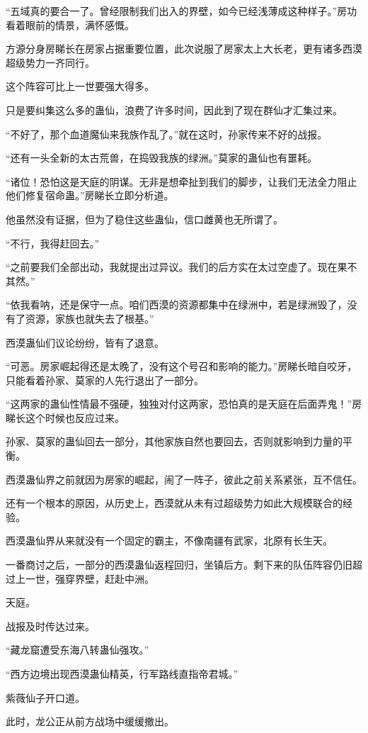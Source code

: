 \begin{this_body}
“五域真的要合一了。曾经限制我们出入的界壁，如今已经浅薄成这种样子。”房功看着眼前的情景，满怀感慨。

方源分身房睇长在房家占据重要位置，此次说服了房家太上大长老，更有诸多西漠超级势力一齐同行。

这个阵容可比上一世要强大得多。

只是要纠集这么多的蛊仙，浪费了许多时间，因此到了现在群仙才汇集过来。

“不好了，那个血道魔仙来我族作乱了。”就在这时，孙家传来不好的战报。

“还有一头全新的太古荒兽，在捣毁我族的绿洲。”莫家的蛊仙也有噩耗。

“诸位！恐怕这是天庭的阴谋。无非是想牵扯到我们的脚步，让我们无法全力阻止他们修复宿命蛊。”房睇长立即分析道。

他虽然没有证据，但为了稳住这些蛊仙，信口雌黄也无所谓了。

“不行，我得赶回去。”

“之前要我们全部出动，我就提出过异议。我们的后方实在太过空虚了。现在果不其然。”

“依我看呐，还是保守一点。咱们西漠的资源都集中在绿洲中，若是绿洲毁了，没有了资源，家族也就失去了根基。”

西漠蛊仙们议论纷纷，皆有了退意。

“可恶。房家崛起得还是太晚了，没有这个号召和影响的能力。”房睇长暗自咬牙，只能看着孙家、莫家的人先行退出了一部分。

“这两家的蛊仙性情最不强硬，独独对付这两家，恐怕真的是天庭在后面弄鬼！”房睇长这个时候也反应过来。

孙家、莫家的蛊仙回去一部分，其他家族自然也要回去，否则就影响到力量的平衡。

西漠蛊仙界之前就因为房家的崛起，闹了一阵子，彼此之前关系紧张，互不信任。

还有一个根本的原因，从历史上，西漠就从未有过超级势力如此大规模联合的经验。

西漠蛊仙界从来就没有一个固定的霸主，不像南疆有武家，北原有长生天。

一番商讨之后，一部分的西漠蛊仙返程回归，坐镇后方。剩下来的队伍阵容仍旧超过上一世，强穿界壁，赶赴中洲。

天庭。

战报及时传达过来。

“藏龙窟遭受东海八转蛊仙强攻。”

“西方边境出现西漠蛊仙精英，行军路线直指帝君城。”

紫薇仙子开口道。

此时，龙公正从前方战场中缓缓撤出。


\end{this_body}
